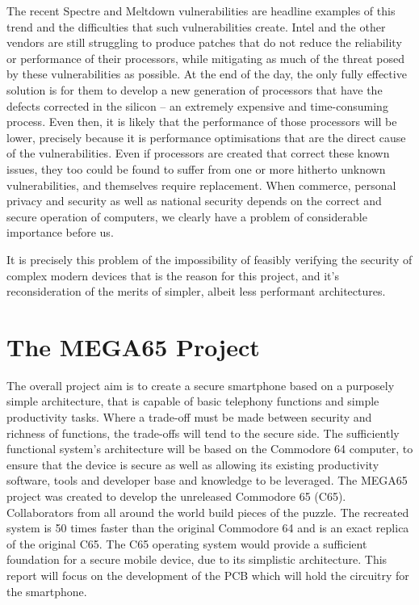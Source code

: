         The recent Spectre  and Meltdown  vulnerabilities are headline examples of this trend and the difficulties that such vulnerabilities create.
        Intel and the other vendors are still struggling to produce patches that do not reduce the reliability or performance of their processors, while mitigating as much of the threat posed by these vulnerabilities as possible.
        At the end of the day, the only fully effective solution is for them to develop a new generation of processors that have the defects corrected in the silicon – an extremely expensive and time-consuming process.
        Even then, it is likely that the performance of those processors will be lower, precisely because it is performance optimisations that are the direct cause of the vulnerabilities.
        Even if processors are created that correct these known issues, they too could be found to suffer from one or more hitherto unknown vulnerabilities, and themselves require replacement.
        When commerce, personal privacy and security as well as national security depends on the correct and secure operation of computers, we clearly have a problem of considerable importance before us.

        It is precisely this problem of the impossibility of feasibly verifying the security of complex modern devices that is the reason for this project, and it's reconsideration of the merits of simpler, albeit less performant architectures.
        


\section{The MEGA65 Project}

The overall project aim is to create a secure smartphone based on a purposely simple architecture, that is capable of basic telephony functions and simple productivity tasks.
Where a trade-off must be made between security and richness of functions, the trade-offs will tend to the secure side.
The sufficiently functional system’s architecture will be based on the Commodore 64 computer, to ensure that the device is secure as well as allowing its existing productivity software, tools and developer base and knowledge to be leveraged. 
The MEGA65 project was created to develop the unreleased Commodore 65 (C65).
Collaborators from all around the world build pieces of the puzzle.
The recreated system is 50 times faster than the original Commodore 64 and is an exact replica of the original C65.
The C65 operating system would provide a sufficient foundation for a secure mobile device, due to its simplistic architecture.  
	This report will focus on the development of the PCB which will hold the circuitry for the smartphone. 


